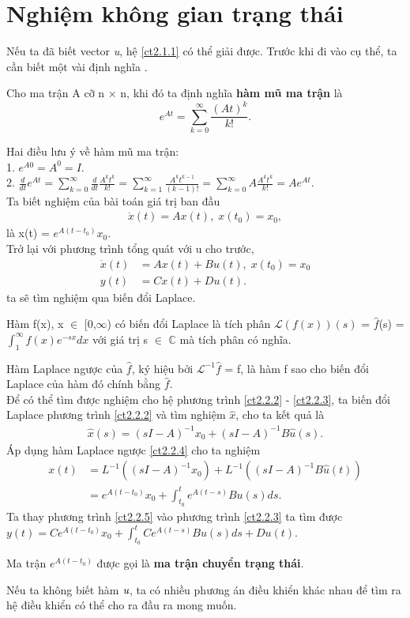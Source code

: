 \section{Nghiệm không gian trạng thái}
Nếu ta đã biết vector \emph{u}, hệ \eqref{ct2.1.1} có thể giải được. Trước khi đi vào cụ thể, ta cần biết một vài định nghĩa \cite{5}.
\begin{definition}
Cho ma trận A cỡ n $\times$ n, khi đó ta định nghĩa \textbf{hàm mũ ma trận} là \[ e^{At} = \sum_{k = 0}^{\infty} \frac{(At)^k}{k!} .\]
\end{definition}
Hai điều lưu ý về hàm mũ ma trận:\\
1. \emph{$e^{A0} = A^0 = I$}. \\
2. \emph{$\frac{d}{dt}e^{At} = \sum_{k = 0}^{\infty} \frac{d}{dt} \frac{A^k t^k}{k!} = \sum_{k = 1}^{\infty} \frac{A^k t^{k-1}}{(k-1)!} = \sum_{k = 0}^{\infty}A\frac{A^k t^k}{k!} = Ae^{At}$}.\\
Ta biết nghiệm của bài toán giá trị ban đầu
\begin{align}
    \dot{x}(t) = Ax(t),\; x(t_0) = x_0, 
\end{align}
là x(t) = $e^{A(t-t_0)}x_0$.\\
Trở lại với phương trình tổng quát với u cho trước,
\begin{align}
    \dot{x}(t) &= Ax(t) + Bu(t), \; x(t_0) = x_0 \label{ct2.2.2} \\ 
    y(t) &= Cx(t) + Du(t). \label{ct2.2.3}
\end{align}
ta sẽ tìm nghiệm qua biến đổi Laplace.
\begin{definition}
Hàm f(x), x $\in$ [0,$\infty$) có biến đổi Laplace là tích phân $\mathcal{L}(f(x))(s)$ = $\hat{f}$(s) = $\displaystyle \int_1^\infty f(x)e^{-sx}dx$ với giá trị s $\in$ $\mathbb{C}$ mà tích phân có nghĩa.
\end{definition}
Hàm Laplace ngược của $\hat{f}$, ký hiệu bởi $\mathcal{L}^{-1} \hat{f}$ = f, là hàm f sao cho biến đổi Laplace của hàm đó chính bằng $\hat{f}$.\\
Để có thể tìm được nghiệm cho hệ phương trình \eqref{ct2.2.2} - \eqref{ct2.2.3}, ta biến đổi Laplace phương trình \eqref{ct2.2.2} và tìm nghiệm $\hat{x}$, cho ta kết quả là
\begin{align}
    \hat{x}(s) = (sI - A)^{-1} x_0 + (sI - A)^{-1} B \hat{u}(s). \label{ct2.2.4}
\end{align}
Áp dụng hàm Laplace ngược \eqref{ct2.2.4} cho ta nghiệm
\begin{align}
    x(t) &= L^{-1}((sI - A)^{-1} x_0) + L^{-1}((sI - A)^{-1} B \hat{u}(t)) \nonumber\\
         &= e^{A(t-t_0)}{x_0} + \displaystyle \int_{t_0}^t e^{A(t-s)}Bu(s)ds. \label{ct2.2.5}
\end{align}
Ta thay phương trình \eqref{ct2.2.5} vào phương trình \eqref{ct2.2.3} ta tìm được $y(t) = Ce^{A(t-t_0)}x_0 + \int_{t_0}^t Ce^{A(t-s)}Bu(s)ds + Du(t).$
\begin{definition}
Ma trận $e^{A(t-t_0)}$ được gọi là \textbf{ma trận chuyển trạng thái}.
\end{definition}
Nếu ta không biết hàm $\emph{u}$, ta có nhiều phương án điều khiển khác nhau để tìm ra hệ điều khiển có thể cho ra đầu ra mong muốn.

